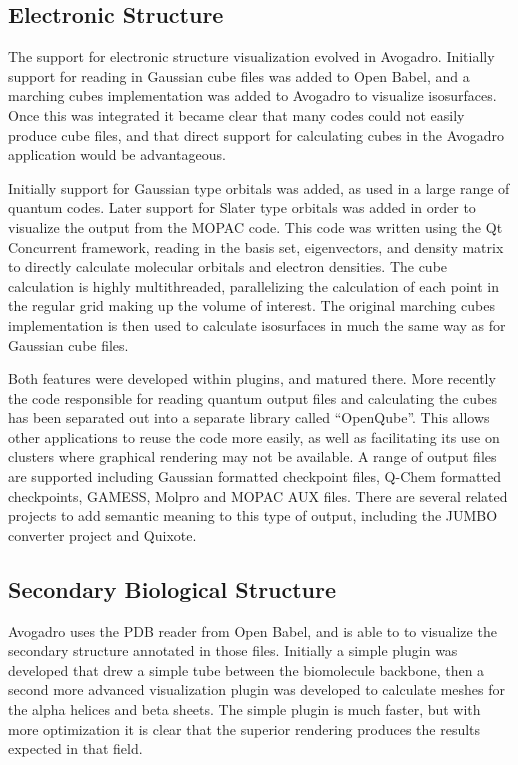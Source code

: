 \documentclass[10pt]{bmc_article}
\newenvironment{bmcformat}{\begin{raggedright}
\baselineskip20pt\sloppy\setboolean{publ}{false}}{\end{raggedright}
\baselineskip20pt\sloppy}
\begin{document}
\begin{bmcformat}
\subsection{Electronic Structure}

The support for electronic structure visualization evolved in Avogadro.
Initially support for reading in Gaussian cube files was added to Open Babel,
and a marching cubes implementation was added to Avogadro to visualize
isosurfaces. Once this was integrated it became clear that many codes could not
easily produce cube files, and that direct support for calculating cubes in the
Avogadro application would be advantageous.

Initially support for Gaussian type orbitals was added, as used in a large
range of quantum codes. Later support for Slater type orbitals was added in
order to visualize the output from the MOPAC code. This code was written using
the Qt Concurrent framework, reading in the basis set, eigenvectors, and density
matrix to directly calculate molecular orbitals and electron
densities. The cube calculation is highly multithreaded, parallelizing the
calculation of each point in the regular grid making up the volume of interest.
The original marching cubes implementation is then used to calculate
isosurfaces in much the same way as for Gaussian cube files.

Both features were developed within plugins, and matured there. More recently
the code responsible for reading quantum output files and calculating the cubes
has been separated out into a separate library called ``OpenQube''. This allows
other applications to reuse the code more easily, as well as facilitating its
use on clusters where graphical rendering may not be available. A range of
output files are supported including Gaussian formatted checkpoint files,
Q-Chem formatted checkpoints, GAMESS, Molpro and MOPAC AUX files. There are
several related projects to add semantic meaning to this type of output,
including the JUMBO converter project and Quixote.

\subsection{Secondary Biological Structure}

Avogadro uses the PDB reader from Open Babel, and is able to to visualize the
secondary structure annotated in those files. Initially a simple plugin was
developed that drew a simple tube between the biomolecule backbone, then a
second more advanced visualization plugin was developed to calculate meshes for
the alpha helices and beta sheets. The simple plugin is much faster, but with
more optimization it is clear that the superior rendering produces the results
expected in that field.


\end{bmcformat}
\end{document}
